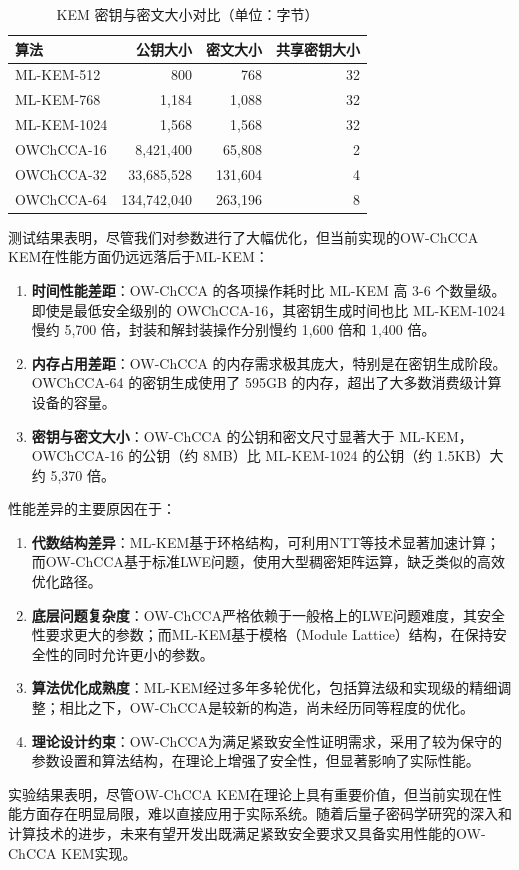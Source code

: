 \begin{table}[ht]
\centering
\caption{KEM 密钥与密文大小对比（单位：字节）}
\label{tab:kem-sizes}
\begin{tabular}{|l|r|r|r|}
\hline
\textbf{算法} & \textbf{公钥大小} & \textbf{密文大小} & \textbf{共享密钥大小} \\
\hline
ML-KEM-512    & 800               & 768              & 32                   \\
ML-KEM-768    & 1,184             & 1,088            & 32                   \\
ML-KEM-1024   & 1,568             & 1,568            & 32                   \\
\hline
OWChCCA-16    & 8,421,400         & 65,808           & 2                    \\
OWChCCA-32    & 33,685,528        & 131,604          & 4                    \\
OWChCCA-64    & 134,742,040       & 263,196          & 8                    \\
\hline
\end{tabular}
\end{table}

测试结果表明，尽管我们对参数进行了大幅优化，但当前实现的OW-ChCCA KEM在性能方面仍远远落后于ML-KEM：

\begin{enumerate}
    \item \textbf{时间性能差距}：OW-ChCCA 的各项操作耗时比 ML-KEM 高 3-6 个数量级。即使是最低安全级别的 OWChCCA-16，其密钥生成时间也比 ML-KEM-1024 慢约 5,700 倍，封装和解封装操作分别慢约 1,600 倍和 1,400 倍。
    
    \item \textbf{内存占用差距}：OW-ChCCA 的内存需求极其庞大，特别是在密钥生成阶段。OWChCCA-64 的密钥生成使用了 595GB 的内存，超出了大多数消费级计算设备的容量。
    
    \item \textbf{密钥与密文大小}：OW-ChCCA 的公钥和密文尺寸显著大于 ML-KEM，OWChCCA-16 的公钥（约 8MB）比 ML-KEM-1024 的公钥（约 1.5KB）大约 5,370 倍。
\end{enumerate}

性能差异的主要原因在于：

\begin{enumerate}
    \item \textbf{代数结构差异}：ML-KEM基于环格结构，可利用NTT等技术显著加速计算；而OW-ChCCA基于标准LWE问题，使用大型稠密矩阵运算，缺乏类似的高效优化路径。
    
    \item \textbf{底层问题复杂度}：OW-ChCCA严格依赖于一般格上的LWE问题难度，其安全性要求更大的参数；而ML-KEM基于模格（Module Lattice）结构，在保持安全性的同时允许更小的参数。
    
    \item \textbf{算法优化成熟度}：ML-KEM经过多年多轮优化，包括算法级和实现级的精细调整；相比之下，OW-ChCCA是较新的构造，尚未经历同等程度的优化。
    
    \item \textbf{理论设计约束}：OW-ChCCA为满足紧致安全性证明需求，采用了较为保守的参数设置和算法结构，在理论上增强了安全性，但显著影响了实际性能。
\end{enumerate}

实验结果表明，尽管OW-ChCCA KEM在理论上具有重要价值，但当前实现在性能方面存在明显局限，难以直接应用于实际系统。随着后量子密码学研究的深入和计算技术的进步，未来有望开发出既满足紧致安全要求又具备实用性能的OW-ChCCA KEM实现。
